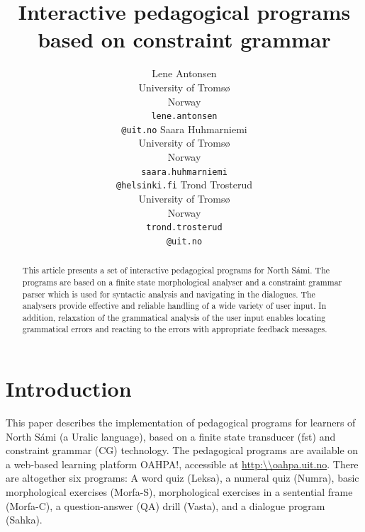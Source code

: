 \documentclass[11pt]{article}
\begin{document}
\title{Interactive pedagogical programs based on constraint grammar}


\author{Lene Antonsen\\
  University of Tromsø\\
  Norway\\
  {\tt lene.antonsen}\\{\tt @uit.no}  \And
  Saara Huhmarniemi\\
  University of Tromsø\\
  Norway\\
  {\tt saara.huhmarniemi}\\{\tt @helsinki.fi}  \And
  Trond Trosterud\\
  University of Tromsø\\
  Norway\\
  {\tt trond.trosterud}\\{\tt @uit.no}}

 
\maketitle

\begin{abstract}
This article presents a set of interactive pedagogical programs for North Sámi. The programs are based on a finite state morphological analyser and  a constraint grammar parser which is used for syntactic analysis and navigating in the dialogues. The analysers provide effective and reliable handling of a wide variety of user input. In addition, relaxation of the grammatical analysis of the user input enables locating grammatical errors and reacting to the errors with appropriate feedback messages. 
\end{abstract}

\section{Introduction}
This paper describes the implementation of pedagogical programs for learners of North Sámi (a Uralic language), based on a finite state transducer (fst) and constraint grammar (CG) technology. %
The pedagogical programs are available on a web-based learning platform OAHPA!, accessible at \url{http:\\oahpa.uit.no}. There are altogether six programs: A word quiz (Leksa), a numeral quiz (Numra), basic morphological exercises (Morfa-S), morphological exercises in a sentential frame (Morfa-C), a question-answer (QA) drill (Vasta), and a dialogue program (Sahka).
\end{document}
